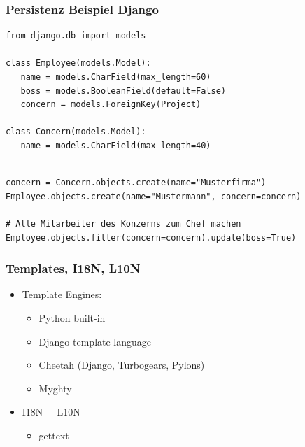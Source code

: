 \documentclass[
    t,
    smaller,
    compress,
]{beamer}
\begin{document}
\begin{frame}[fragile]
  \frametitle{Persistenz Beispiel Django}
  
\begin{lstlisting}
from django.db import models
    
class Employee(models.Model):
   name = models.CharField(max_length=60)
   boss = models.BooleanField(default=False)
   concern = models.ForeignKey(Project)

class Concern(models.Model):   
   name = models.CharField(max_length=40)
\end{lstlisting}
  
\begin{lstlisting}

concern = Concern.objects.create(name="Musterfirma")
Employee.objects.create(name="Mustermann", concern=concern)
	
# Alle Mitarbeiter des Konzerns zum Chef machen
Employee.objects.filter(concern=concern).update(boss=True) 
\end{lstlisting}
  
  
\end{frame}



\begin{frame}
  \frametitle{Templates, I18N, L10N}
  \begin{itemize}[<1->]
    \item Template Engines:
        \begin{itemize}[<1->]
            \item Python built-in
            \item Django template language
            \item Cheetah (Django, Turbogears, Pylons)
            \item Myghty
        \end{itemize}
  \item I18N + L10N
  \begin{itemize}[<1->]
    \item gettext
   \end{itemize}
  \end{itemize}

\end{frame}
\end{document}
